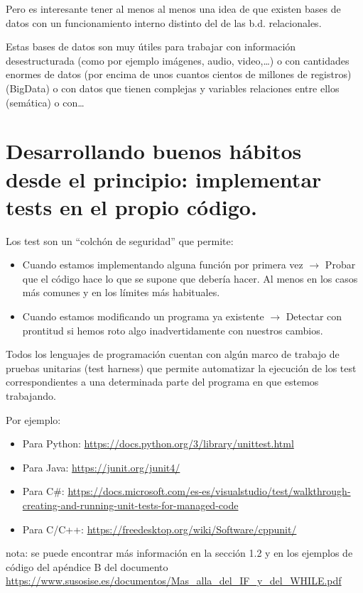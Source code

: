 \documentclass[spanish,12pt,a4paper,final,oneside]{book}
\begin{document}
Pero es interesante tener al menos al menos una idea de que existen bases de datos con un funcionamiento interno distinto del de las b.d. relacionales.

Estas bases de datos son muy útiles para trabajar con información desestructurada (como por ejemplo imágenes, audio, video,\ldots) o con cantidades enormes de datos (por encima de unos cuantos cientos de millones de registros)(BigData) o con datos que tienen complejas y variables relaciones entre ellos (semática) o con\ldots




\chapter{Desarrollando buenos hábitos desde el principio: implementar tests en el propio código.}

Los test son un ``colchón de seguridad'' que permite:
\begin{itemize}
\item Cuando estamos implementando alguna función por primera vez $\rightarrow$  Probar que el código hace lo que se supone que debería hacer. Al menos en los casos más comunes y en los límites más habituales.
\item Cuando estamos modificando un programa ya existente $\rightarrow$  Detectar con prontitud si hemos roto algo inadvertidamente con nuestros cambios.
\end{itemize}

Todos los lenguajes de programación cuentan con algún marco de trabajo de pruebas unitarias (test harness) que permite automatizar la ejecución de los test correspondientes a una determinada parte del programa en que estemos trabajando.

Por ejemplo:
\begin{itemize}
\item Para Python: \url{https://docs.python.org/3/library/unittest.html}
\item Para Java: \url{https://junit.org/junit4/}
\item Para C\#: \url{https://docs.microsoft.com/es-es/visualstudio/test/walkthrough-creating-and-running-unit-tests-for-managed-code}
\item Para C/C++: \url{https://freedesktop.org/wiki/Software/cppunit/}
\end{itemize}

\vspace{1cm}
nota: se puede encontrar más información en la sección 1.2 y en los ejemplos de código del apéndice B del documento \url{https://www.susosise.es/documentos/Mas_alla_del_IF_y_del_WHILE.pdf}
\end{document}
